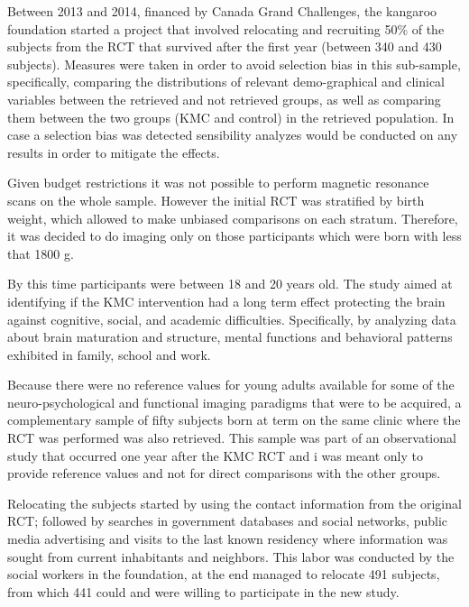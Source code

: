 


Between 2013 and 2014, financed by Canada Grand Challenges, the kangaroo foundation started a project that involved relocating and recruiting 50\% of the subjects from the RCT that survived after the first year (between 340 and 430 subjects). Measures were taken in order to avoid selection bias in this sub-sample, specifically, comparing the distributions of relevant demo-graphical and clinical variables between the retrieved and not retrieved groups, as well as comparing them between the two groups (KMC and control) in the retrieved population. In case a selection bias was detected sensibility analyzes would be conducted on any results in order to mitigate the effects. 

Given budget restrictions it was not possible to perform magnetic resonance scans on the whole sample. However the initial RCT was stratified by birth weight, which allowed to make unbiased comparisons on each stratum. Therefore, it was decided to do imaging only on those participants which were born with less that 1800 g. 

By this time participants were between 18 and 20 years old. The study aimed at identifying if the KMC intervention had a long term effect protecting the brain against cognitive, social, and academic difficulties. Specifically, by analyzing data about brain maturation and structure, mental functions and behavioral patterns exhibited in family, school and work. 

Because there were no reference values for young adults available for some of the neuro-psychological and functional imaging paradigms that were to be acquired, a complementary sample of fifty subjects born at term on the same clinic where the RCT was performed was also retrieved. This sample was part of an observational study that occurred one year after the KMC RCT and i was meant only to provide reference values and not for direct comparisons with the other groups.

Relocating the subjects started by using the contact information from the original RCT; followed by searches in government databases and social networks, public media advertising and visits to the last known residency where information was sought from current inhabitants and neighbors. This labor was conducted by the social workers in the foundation, at the end managed to relocate 491 subjects, from which 441 could and were willing to participate in the new study. 


